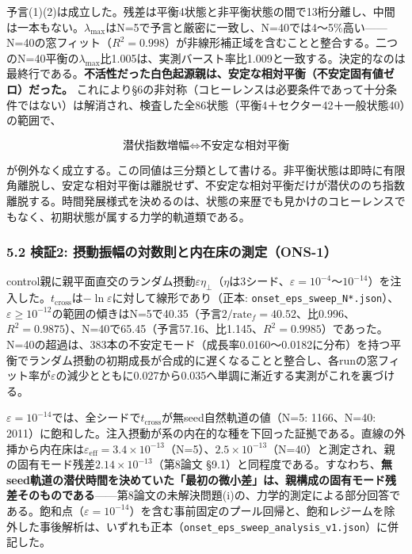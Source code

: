 \documentclass[
  a4paper,
]{ltjsarticle}
\begin{document}
予言(1)(2)は成立した。残差は平衡4状態と非平衡状態の間で13桁分離し、中間は一本もない。\(\lambda_{\max}\)はN=5で予言と厳密に一致し、N=40では4〜5\%高い------N=40の窓フィット（\(R^2=0.998\)）が非線形補正域を含むことと整合する。二つのN=40平衡の\(\lambda_{\max}\)比1.005は、実測バースト率比1.009と一致する。決定的なのは最終行である。\textbf{不活性だった白色起源親は、安定な相対平衡（不安定固有値ゼロ）だった。}
これにより§6の非対称（コヒーレンスは必要条件であって十分条件ではない）は解消され、検査した全86状態（平衡4＋セクター42＋一般状態40）の範囲で、

\[\boxed{\text{潜伏指数増幅}\iff\text{不安定な相対平衡}}\]

が例外なく成立する。この同値は三分類として書ける。非平衡状態は即時に有限角離脱し、安定な相対平衡は離脱せず、不安定な相対平衡だけが潜伏ののち指数離脱する。時間発展様式を決めるのは、状態の来歴でも見かけのコヒーレンスでもなく、初期状態が属する力学的軌道類である。

\subsubsection{5.2 検証2:
摂動振幅の対数則と内在床の測定（ONS-1）}\label{ux691cux8a3c2-ux6442ux52d5ux632fux5e45ux306eux5bfeux6570ux5247ux3068ux5185ux5728ux5e8aux306eux6e2cux5b9aons-1}

control親に親平面直交のランダム摂動\(\varepsilon\eta_\perp\)（\(\eta\)は3シード、\(\varepsilon=10^{-4}\)〜\(10^{-14}\)）を注入した。\(t_{\mathrm{cross}}\)は\(-\ln\varepsilon\)に対して線形であり（正本:
\texttt{onset\_eps\_sweep\_N*.json}）、\(\varepsilon\ge10^{-12}\)の範囲の傾きはN=5で40.35（予言\(2/\text{rate}_f=40.52\)、比0.996、\(R^2=0.9875\)）、N=40で65.45（予言57.16、比1.145、\(R^2=0.9985\)）であった。N=40の超過は、383本の不安定モード（成長率0.0160〜0.0182に分布）を持つ平衡でランダム摂動の初期成長が合成的に遅くなることと整合し、各runの窓フィット率が\(\varepsilon\)の減少とともに0.027から0.035へ単調に漸近する実測がこれを裏づける。

\(\varepsilon=10^{-14}\)では、全シードで\(t_{\mathrm{cross}}\)が無seed自然軌道の値（N=5:
1166、N=40:
2011）に飽和した。注入摂動が系の内在的な種を下回った証拠である。直線の外挿から内在床は\(\varepsilon_{\mathrm{eff}}=3.4\times10^{-13}\)（N=5）、\(2.5\times10^{-13}\)（N=40）と測定され、親の固有モード残差\(2.14\times10^{-13}\)（第8論文
§9.1）と同程度である。すなわち、\textbf{無seed軌道の潜伏時間を決めていた「最初の微小差」は、親構成の固有モード残差そのものである}------第8論文の未解決問題(i)の、力学的測定による部分回答である。飽和点（\(\varepsilon=10^{-14}\)）を含む事前固定のプール回帰と、飽和レジームを除外した事後解析は、いずれも正本（\texttt{onset\_eps\_sweep\_analysis\_v1.json}）に併記した。
\end{document}

